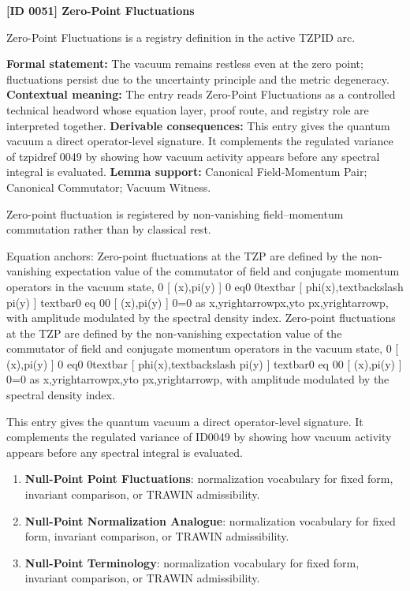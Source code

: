 \clearpage
\noindent\textbf{[ID 0051] Zero-Point Fluctuations}\par
\vspace{0.35em}
\begingroup\small
{}
Zero-Point Fluctuations is a registry definition in the active TZPID arc.

\begingroup\footnotesize\setlength{\emergencystretch}{3em}\sloppy
\textbf{Formal statement:} The vacuum remains restless even at the zero point; fluctuations persist due to the uncertainty principle and the metric degeneracy. \textbf{Contextual meaning:} The entry reads Zero-Point Fluctuations as a controlled technical headword whose equation layer, proof route, and registry role are interpreted together. \textbf{Derivable consequences:} This entry gives the quantum vacuum a direct operator-level signature. It complements the regulated variance of tzpidref 0049 by showing how vacuum activity appears before any spectral integral is evaluated. \textbf{Lemma support:} Canonical Field-Momentum Pair; Canonical Commutator; Vacuum Witness.\par
\endgroup

Zero-point fluctuation is registered by non-vanishing field--momentum commutation rather than by classical rest.

Equation anchors: Zero-point fluctuations at the TZP are defined by the non-vanishing expectation value of the commutator of field and conjugate momentum operators in the vacuum state, 0  [  (x),pi(y) ]  0 eq0 0textbar [ phi(x),textbackslash pi(y) ] textbar0 eq 00  [  (x),pi(y) ]  0=0 as x,yrightarrowpx,yto px,yrightarrowp, with amplitude modulated by the spectral density index. Zero-point fluctuations at the TZP are defined by the non-vanishing expectation value of the commutator of field and conjugate momentum operators in the vacuum state, 0  [  (x),pi(y) ]  0 eq0 0textbar [ phi(x),textbackslash pi(y) ] textbar0 eq 00  [  (x),pi(y) ]  0=0 as x,yrightarrowpx,yto px,yrightarrowp, with amplitude modulated by the spectral density index.

This entry gives the quantum vacuum a direct operator-level signature. It complements the regulated variance of ID0049 by showing how vacuum activity appears before any spectral integral is evaluated.
\endgroup

\begingroup\footnotesize\sloppy
\begin{enumerate}[leftmargin=1.35em,itemsep=1pt,topsep=1pt,parsep=0pt]
\item \textbf{Null-Point Point Fluctuations}: normalization vocabulary for fixed form, invariant comparison, or TRAWIN admissibility.
\item \textbf{Null-Point Normalization Analogue}: normalization vocabulary for fixed form, invariant comparison, or TRAWIN admissibility.
\item \textbf{Null-Point Terminology}: normalization vocabulary for fixed form, invariant comparison, or TRAWIN admissibility.
\end{enumerate}
\endgroup

